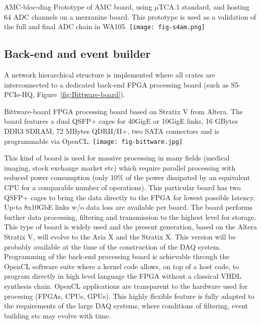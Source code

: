 \begin{cdrfigure}{AMC-bloc-diag}
{\small Prototype of AMC board, using $\mu$TCA.1 standard, and hosting 
64 ADC channels on a mezzanine board. This prototype is used as a validation 
of the full and final ADC chain in WA105.}
\texttt{[image: fig-s4am.png]}
\end{cdrfigure}

\subsection{Back-end and event builder}


A network hierarchical structure is implemented where all crates are interconnected to a dedicated back-end FPGA processing board (such as
S5-PCIe-HQ, Figure~\ref{fig:Bittware-board}). 

\begin{cdrfigure}{Bittware-board}
{\small FPGA processing board based on Stratix V from Altera. The board 
features a dual QSFP+ cages for 40GigE or 10GigE links, 16 GBytes DDR3 SDRAM, 
72 MBytes QDRII/II+, two SATA connectors and is programmable via OpenCL.}
\texttt{[image: fig-bittware.jpg]}
\end{cdrfigure}

This kind of board is used for massive processing in many fields (medical imaging, stock exchange market etc) which require parallel
processing with reduced power consumption (only 10\% of the power dissipated by an equivalent CPU for a comparable number of
operations). This particular board has two QSFP+ cages to bring the data directly to the FPGA for lowest possible latency. Up-to 8x10GbE
links w/o data loss are available per board.  The board performs further data processing, filtering and transmission to the highest
level for storage. This type of board is widely used and the present generation, based on the Altera Stratix V, will evolve to the Aria X
and the Stratix X. This version will be probably available at the time of the construction of the DAQ system. Programming of the back-end
processing board is achievable through the OpenCL software suite where a kernel code allows, on top of a host code, to program directly in
high level language the FPGA without a classical VHDL synthesis chain. OpenCL applications are transparent to the hardware used for
procesing (FPGAs, CPUs, GPUs). This highly flexible feature is fully adapted to the requirements of the large DAQ systems, where conditions
of filtering, event building etc may evolve with time.
 
